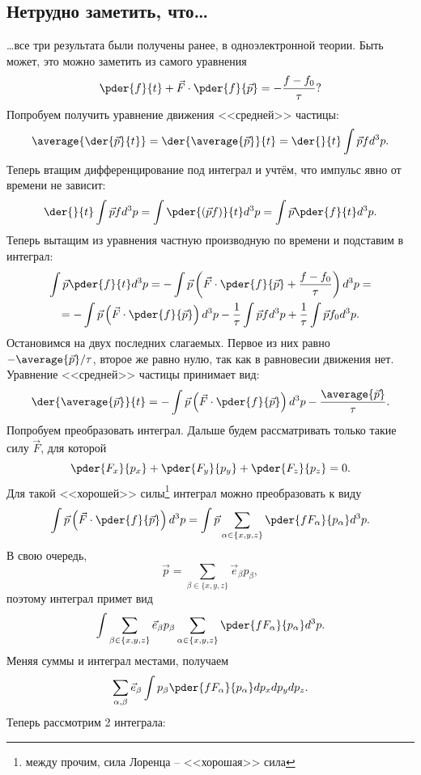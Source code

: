 \subsection{Нетрудно заметить, что\ldots}
\ldots все три результата были получены ранее, в одноэлектронной теории. Быть
может, это можно заметить из самого уравнения
\[
    \pder{f}{t} + \vec{F}\cdot\pder{f}{\vec{p}} = -\frac{f-f_0}{\tau}?
\]
Попробуем получить уравнение движения <<средней>> частицы:
\[
    \average{\der{\vec{p}}{t}} = \der{\average{\vec{p}}}{t} =
    \der{}{t}\int\vec{p} f d^3p.
\]
Теперь втащим дифференцирование под интеграл и учтём, что импульс явно от
времени не зависит:
\[
    \der{}{t}\int\vec{p} f d^3p = \int\pder{(\vec{p} f)}{t} d^3p =
    \int\vec{p}\pder{f}{t} d^3p.
\]
Теперь вытащим из уравнения частную производную по времени и подставим в
интеграл:
\begin{gather*}
    \int\vec{p}\pder{f}{t} d^3p = -\int\vec{p}
    \left(\vec{F}\cdot\pder{f}{\vec{p}} + \frac{f-f_0}{\tau}\right)d^3p = \\ =
    -\int\vec{p}\left(\vec{F}\cdot\pder{f}{\vec{p}}\right)d^3p
    -\frac{1}{\tau}\int\vec{p}fd^3p + \frac{1}{\tau}\int\vec{p}f_0d^3p.
\end{gather*}
Остановимся на двух последних слагаемых. Первое из них равно
\( -\average{\vec{p}}/\tau \), второе же равно нулю, так как в равновесии
движения нет. Уравнение <<средней>> частицы принимает вид:
\[
    \der{\average{\vec{p}}}{t} =
    -\int\vec{p}\left(\vec{F}\cdot\pder{f}{\vec{p}}\right)d^3p
    -\frac{\average{\vec{p}}}{\tau}.
\]
Попробуем преобразовать интеграл. Дальше будем рассматривать только такие силу
\( \vec{F} \), для которой
\[
    \pder{F_x}{p_x} + \pder{F_y}{p_y} + \pder{F_z}{p_z} = 0.
\]
Для такой <<хорошей>> силы\footnote{между прочим, сила Лоренца -- <<хорошая>>
сила} интеграл можно преобразовать к виду
\[
    \int\vec{p}\left(\vec{F}\cdot\pder{f}{\vec{p}}\right)d^3p =
    \int\vec{p}\sum_{\alpha\in\{x,y,z\}}\pder{fF_\alpha}{p_\alpha}d^3p.
\]
В свою очередь,
\[
    \vec{p} = \sum_{\beta\in\{x,y,z\}}\vec{e}_\beta p_\beta,
\]
поэтому интеграл примет вид
\[
    \int\sum_{\beta\in\{x,y,z\}}\vec{e}_\beta p_\beta
    \sum_{\alpha\in\{x,y,z\}}\pder{fF_\alpha}{p_\alpha}d^3p.
\]
Меняя суммы и интеграл местами, получаем
\[
    \sum_{\alpha,\beta}\vec{e}_\beta \int p_\beta \pder{fF_\alpha}{p_\alpha}
    dp_xdp_ydp_z.
\]
Теперь рассмотрим 2 интеграла:
